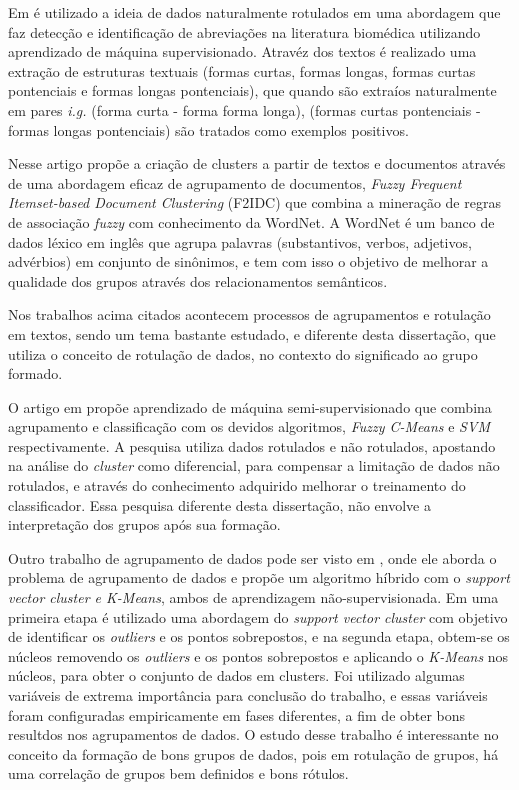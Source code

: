 Em \cite{Yeganova2010} é utilizado a ideia de dados naturalmente rotulados em uma abordagem que faz  detecção  e identificação de abreviações na literatura biomédica utilizando aprendizado de máquina supervisionado. Atravéz dos textos é realizado uma extração de estruturas textuais (formas curtas, formas longas, formas curtas pontenciais e formas longas pontenciais), que quando são extraíos naturalmente em pares \textit{i.g.} (forma curta - forma forma longa), (formas curtas pontenciais - formas longas pontenciais) são tratados como exemplos positivos. 

Nesse artigo \cite{Chen2011} propõe a criação de clusters a partir de textos e documentos através de uma abordagem eficaz de agrupamento de documentos, \textit{Fuzzy Frequent Itemset-based Document Clustering} (F2IDC) que combina a mineração de regras de associação \textit{fuzzy} com conhecimento da WordNet. A WordNet é um banco de dados léxico em inglês que agrupa palavras (substantivos, verbos, adjetivos, advérbios) em conjunto de sinônimos, e tem com isso o objetivo de  melhorar a qualidade dos grupos através dos relacionamentos semânticos.
 
Nos trabalhos acima citados \cite{Jirasirilerd2018,Yeganova2010,Chen2011} acontecem processos de agrupamentos e rotulação em textos, sendo um tema bastante estudado, e diferente desta dissertação, que utiliza o conceito de rotulação de dados, no contexto do significado ao grupo formado.



O artigo em \cite{Gan2013} propõe aprendizado de máquina semi-supervisionado que combina agrupamento e classificação com os devidos algoritmos, \textit{Fuzzy C-Means} e \textit{SVM} respectivamente. A pesquisa utiliza dados rotulados e não rotulados, apostando na análise do \textit{cluster} como diferencial, para compensar a limitação de dados não rotulados, e através do conhecimento adquirido melhorar o treinamento do classificador. Essa pesquisa \cite{Gan2013} diferente desta dissertação, não envolve a interpretação dos grupos após sua formação.

Outro trabalho de agrupamento de dados pode ser visto em \cite{Sun2011}, onde ele aborda o problema de agrupamento de dados e propõe um algoritmo híbrido com o \textit{support vector cluster e K-Means}, ambos de aprendizagem não-supervisionada. Em uma primeira etapa é utilizado uma abordagem do \textit{support vector cluster} com objetivo de identificar os \textit{outliers} e os pontos sobrepostos, e na segunda etapa, obtem-se os núcleos removendo os \textit{outliers} e os pontos sobrepostos e aplicando o \textit{K-Means} nos núcleos, para obter o conjunto de dados em clusters. Foi utilizado algumas variáveis de extrema importância para conclusão do trabalho, e essas variáveis foram configuradas empiricamente em fases diferentes, a fim de obter bons resultdos nos agrupamentos de dados. O estudo desse trabalho é interessante no conceito da formação de bons grupos de dados, pois em rotulação de grupos, há uma correlação de grupos bem definidos e bons rótulos. 

